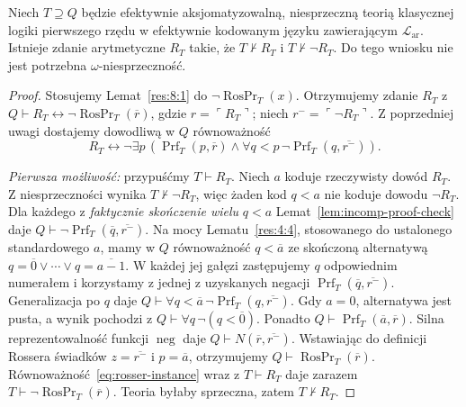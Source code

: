 \begin{twierdzenie}\label{thm:rosser-first}
Niech $T\supseteq Q$ będzie efektywnie aksjomatyzowalną,
niesprzeczną teorią klasycznej logiki pierwszego rzędu
w efektywnie kodowanym języku zawierającym
$\mathcal L_{\mathrm{ar}}$.
Istnieje zdanie arytmetyczne $R_T$ takie, że
$T\nvdash R_T$ i $T\nvdash\neg R_T$.
Do tego wniosku nie jest potrzebna $\omega$-niesprzeczność.
\end{twierdzenie}
\begin{proof}
Stosujemy Lemat~\ref{res:8:1} do
$\neg\operatorname{RosPr}_T(x)$.
Otrzymujemy zdanie $R_T$ z
$Q\vdash R_T\leftrightarrow\neg\operatorname{RosPr}_T(\overline r)$,
gdzie $r=\ulcorner R_T\urcorner$; niech
$r^-=\ulcorner\neg R_T\urcorner$.
Z poprzedniej uwagi dostajemy dowodliwą w $Q$
równoważność
\begin{equation}\label{eq:rosser-instance}
R_T\leftrightarrow\neg\exists p\,
\left(\operatorname{Prf}_T(p,\overline r)\land
 \forall q<p\,\neg\operatorname{Prf}_T(q,\overline{r^-})\right).
\end{equation}

\emph{Pierwsza możliwość:} przypuśćmy $T\vdash R_T$.
Niech $a$ koduje rzeczywisty dowód $R_T$.
Z niesprzeczności wynika $T\nvdash\neg R_T$,
więc żaden kod $q<a$ nie koduje dowodu $\neg R_T$.
Dla każdego z \emph{faktycznie skończenie wielu} $q<a$
Lemat~\ref{lem:incomp-proof-check} daje
$Q\vdash\neg\operatorname{Prf}_T(\overline q,\overline{r^-})$.
Na mocy Lematu~\ref{res:4:4}, stosowanego do ustalonego
standardowego $a$, mamy w $Q$ równoważność
$q<\overline a$ ze skończoną alternatywą
$q=\overline0\lor\cdots\lor q=\overline{a-1}$.
W każdej jej gałęzi zastępujemy $q$ odpowiednim numerałem
i korzystamy z jednej z uzyskanych negacji
$\operatorname{Prf}_T(\overline q,\overline{r^-})$.
Generalizacja po $q$ daje
$Q\vdash\forall q<\overline a\,\neg\operatorname{Prf}_T(q,\overline{r^-})$.
Gdy $a=0$, alternatywa jest pusta, a wynik pochodzi
z $Q\vdash\forall q\,\neg(q<\overline0)$.
Ponadto $Q\vdash\operatorname{Prf}_T(\overline a,\overline r)$.
Silna reprezentowalność funkcji $\operatorname{neg}$ daje
$Q\vdash N(\overline r,\overline{r^-})$.
Wstawiając do definicji Rossera świadków
$z=\overline{r^-}$ i $p=\overline a$, otrzymujemy
$Q\vdash\operatorname{RosPr}_T(\overline r)$.
Równoważność~\eqref{eq:rosser-instance} wraz z
$T\vdash R_T$ daje zarazem
$T\vdash\neg\operatorname{RosPr}_T(\overline r)$.
Teoria byłaby sprzeczna, zatem $T\nvdash R_T$.


\end{proof}
